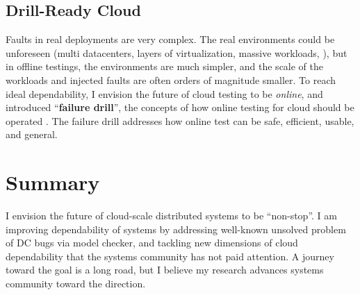 \documentclass[11pt]{article}
\begin{document}
\subsection{Drill-Ready Cloud} 

Faults in real deployments are very complex. The real environments could be
unforeseen (multi datacenters, layers of virtualization, massive
workloads, \etc), but in offline testings, the environments are much simpler, and
the scale of the workloads and injected faults are often orders of magnitude
smaller. To reach ideal dependability, I envision the future of cloud testing to
be \textit{online}, and introduced ``\textbf{failure drill}'', the concepts of
how online testing for cloud should be operated
\cite{Leesatapornwongsa+14-Drill-fixed}.  The failure drill addresses how online
test can be safe, efficient, usable, and general.

\section{Summary}

I envision the future of cloud-scale distributed systems to be ``non-stop''. I
am improving dependability of systems by addressing well-known unsolved problem
of DC bugs via model checker, and tackling new dimensions of cloud dependability 
that the systems community has not paid attention. A journey
toward the goal is a long road, but I believe my research advances systems
community toward the direction. 


\end{document}
